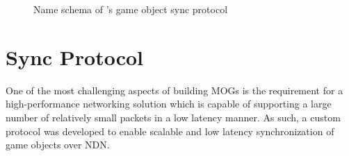
\begin{figure*}
    \centering
    \centering
    \caption{Name schema of \game{}'s game object sync protocol}
    \label{fig:des:sync-protocol-name}
    \vspace*{\floatsep}
\end{figure*}%
\section{\game{} Sync Protocol}\label{sec:des:sync-protocol}

One of the most challenging aspects of building MOGs is the requirement for a high-performance networking solution which is capable of supporting a large number of relatively small packets in a low latency manner. As such, a custom protocol was developed to enable scalable and low latency synchronization of game objects over NDN.



